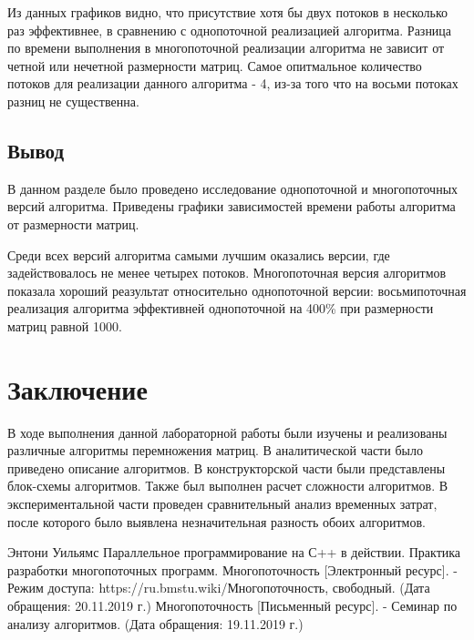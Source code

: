 \documentclass[12pt, a4paper]{report}
\begin{document}
	Из данных графиков видно, что присутствие хотя бы двух потоков в несколько раз эффективнее, в сравнению с однопоточной реализацией алгоритма. Разница по времени выполнения в многопоточной реализации алгоритма не зависит от четной или нечетной размерности матриц. Самое опитмальное количество потоков для реализации данного алгоритма - 4, из-за того что на восьми потоках разниц не существенна. 
	\newpage
	
	\section{Вывод}
	
	\hspace{0.6cm}В данном разделе было проведено исследование однопоточной и многопоточных версий алгоритма. Приведены графики зависимостей времени работы алгоритма от размерности матриц.
	
	\vspace{0.3cm}Среди всех версий алгоритма самыми лучшим оказались версии, где задействовалось не менее четырех потоков. Многопоточная версия алгоритмов показала хороший реазультат относительно однопоточной версии: восьмипоточная реализация алгоритма эффективней однопоточной на 400\% при размерности матриц равной 1000.

	\newpage

	\chapter{Заключение}
		\vspace{-0.6cm}\hspace{0.5cm}В ходе выполнения данной лабораторной работы были изучены и реализованы различные алгоритмы перемножения матриц. В аналитической части было приведено описание алгоритмов. В конструкторской части были представлены блок-схемы алгоритмов. Также был выполнен расчет сложности алгоритмов. В экспериментальной части проведен сравнительный анализ временных затрат, после которого было выявлена незначительная разность обоих алгоритмов.
	
	\newpage

\begin{thebibliography}{3}
	Энтони Уильямс Параллельное программирование на С++ в действии. Практика разработки многопоточных программ.
	Многопоточность [Электронный ресурс]. - Режим доступа: https://ru.bmstu.wiki/Многопоточность, свободный. (Дата обращения: 20.11.2019 г.)
	Многопоточность [Письменный ресурс]. - Семинар по анализу алгоритмов. (Дата обращения: 19.11.2019 г.)
\end{thebibliography}
\end{document}
